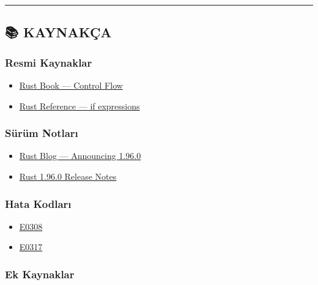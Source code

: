 \documentclass[12pt,a4paper]{article}
\begin{document}
\begin{center}\rule{0.5\linewidth}{0.5pt}\end{center}

\subsection{📚 KAYNAKÇA}\label{kaynakça-6}

\subsubsection{Resmi Kaynaklar}\label{resmi-kaynaklar-6}

\begin{itemize}
\tightlist
\item
  \href{https://doc.rust-lang.org/book/ch03-05-control-flow.html}{Rust Book --- Control Flow}
\item
  \href{https://doc.rust-lang.org/reference/expressions/if-expr.html}{Rust Reference --- if expressions}
\end{itemize}

\subsubsection{Sürüm Notları}\label{sürüm-notları-6}

\begin{itemize}
\tightlist
\item
  \href{https://blog.rust-lang.org/2026/05/28/Rust-1.96.0/}{Rust Blog --- Announcing 1.96.0}
\item
  \href{https://doc.rust-lang.org/stable/releases.html\#version-1960-2026-05-28}{Rust 1.96.0 Release Notes}
\end{itemize}

\subsubsection{Hata Kodları}\label{hata-kodları-6}

\begin{itemize}
\tightlist
\item
  \href{https://doc.rust-lang.org/error_codes/E0308.html}{E0308}
\item
  \href{https://doc.rust-lang.org/error_codes/E0317.html}{E0317}
\end{itemize}

\subsubsection{Ek Kaynaklar}\label{ek-kaynaklar-6}
\end{document}
